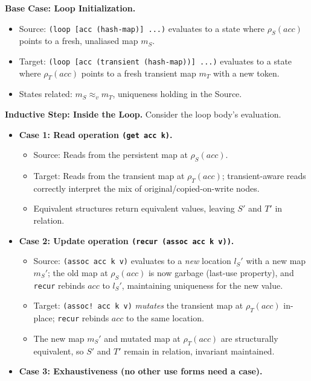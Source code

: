 \documentclass[sigplan,review,anonymous]{acmart}
\begin{document}
\textbf{Base Case: Loop Initialization.}
\begin{itemize}
    \item Source: \texttt{(loop [acc (hash-map)] ...)} evaluates to a state where $\rho_S(acc)$ points to a fresh, unaliased map $m_S$.
    \item Target: \texttt{(loop [acc (transient (hash-map))] ...)} evaluates to a state where $\rho_T(acc)$ points to a fresh transient map $m_T$ with a new token.
    \item States related: $m_S \approx_v m_T$, uniqueness holding in the Source.
\end{itemize}

\textbf{Inductive Step: Inside the Loop.} Consider the loop body's evaluation.

\begin{itemize}
    \item \textbf{Case 1: Read operation \texttt{(get acc k)}.}
    \begin{itemize}
        \item Source: Reads from the persistent map at $\rho_S(acc)$.
        \item Target: Reads from the transient map at $\rho_T(acc)$; transient-aware reads correctly interpret the mix of original/copied-on-write nodes.
        \item Equivalent structures return equivalent values, leaving $S'$ and $T'$ in relation.
    \end{itemize}
    \item \textbf{Case 2: Update operation \texttt{(recur (assoc acc k v))}.}
    \begin{itemize}
        \item Source: \texttt{(assoc acc k v)} evaluates to a \emph{new} location $l_S'$ with a new map $m_S'$; the old map at $\rho_S(acc)$ is now garbage (last-use property), and \texttt{recur} rebinds $acc$ to $l_S'$, maintaining uniqueness for the new value.
        \item Target: \texttt{(assoc! acc k v)} \emph{mutates} the transient map at $\rho_T(acc)$ in-place; \texttt{recur} rebinds $acc$ to the same location.
        \item The new map $m_S'$ and mutated map at $\rho_T(acc)$ are structurally equivalent, so $S'$ and $T'$ remain in relation, invariant maintained.
    \end{itemize}
    \item \textbf{Case 3: Exhaustiveness (no other use forms need a case).}
    \begin{itemize}

\end{itemize}
\end{itemize}
\end{document}
